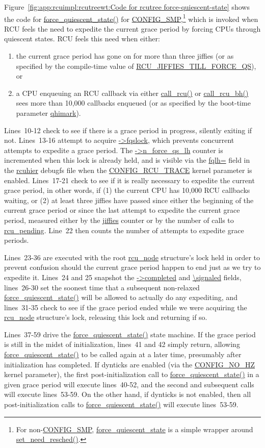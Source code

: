 Figure~\ref{fig:app:rcuimpl:rcutreewt:Code for rcutree force-quiescent-state}
shows the code for \url{force_quiescent_state()} for
\url{CONFIG_SMP},\footnote{
	For non-\url{CONFIG_SMP}, \url{force_quiescent_state} is a
	simple wrapper around \url{set_need_resched()}.}
which is invoked when RCU feels the need to expedite the current
grace period by forcing CPUs through quiescent states.
RCU feels this need when either:
\begin{enumerate}
\item	the current grace period has gone on for more than three jiffies
	(or as specified by the compile-time value of
	\url{RCU_JIFFIES_TILL_FORCE_QS}), or
\item	a CPU enqueuing an RCU callback via either \url{call_rcu()}
	or \url{call_rcu_bh()} sees more than 10,000 callbacks enqueued
	(or as specified by the boot-time parameter \url{qhimark}).
\end{enumerate}

Lines~10-12 check to see if there is a grace period in progress,
silently exiting if not.
Lines~13-16 attempt to acquire \url{->fqslock}, which prevents concurrent
attempts to expedite a grace period.
The \url{->n_force_qs_lh} counter is incremented when this lock is
already held, and is visible via the \url{fqlh=} field
in the \url{rcuhier} debugfs file when the \url{CONFIG_RCU_TRACE} kernel
parameter is enabled.
Lines~17-21 check to see if it is really necessary to expedite the
current grace period, in other words, if (1) the current CPU has 10,000
RCU callbacks waiting, or (2) at least three jiffies have passed
since either the beginning of the current grace period or since the
last attempt to expedite the current grace period, measured either
by the \url{jiffies} counter or by the number of calls to
\url{rcu_pending}.
Line~22 then counts the number of attempts to expedite grace periods.

Lines~23-36 are executed with the root \url{rcu_node} structure's lock
held in order to prevent confusion should the current grace period
happen to end just as we try to expedite it.
Lines~24 and 25 snapshot the \url{->completed} and \url{\signaled} fields,
lines~26-30 set the soonest time that a subsequent non-relaxed
\url{force_quiescent_state()} will be allowed to actually do
any expediting, and lines~31-35 check to see if the grace period
ended while we were acquiring the \url{rcu_node} structure's lock,
releasing this lock and returning if so.

Lines~37-59 drive the \url{force_quiescent_state()} state machine.
If the grace period is still in the midst of initialization,
lines~41 and 42 simply return, allowing \url{force_quiescent_state()}
to be called again at a later time, presumably after initialization
has completed.
If dynticks are enabled (via the \url{CONFIG_NO_HZ} kernel
parameter), the first post-initialization call
to \url{force_quiescent_state()} in a given grace period will
execute lines~40-52, and the second and subsequent calls will
execute lines~53-59.
On the other hand, if dynticks is not enabled, then all post-initialization
calls to \url{force_quiescent_state()} will execute lines~53-59.

